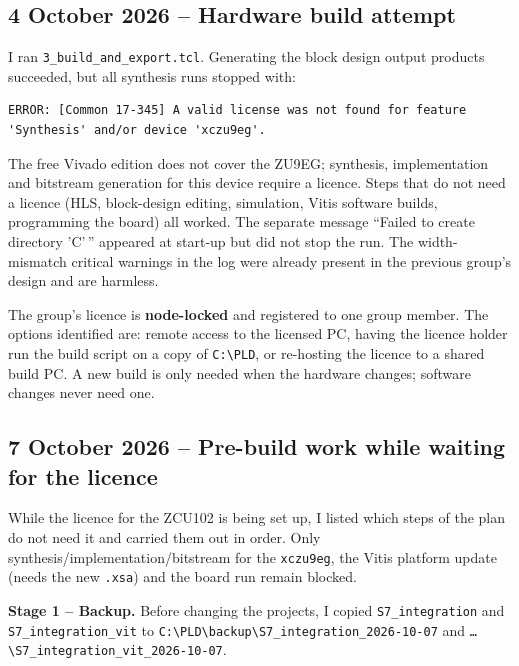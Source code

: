 \documentclass[11pt,a4paper]{article}
\newcommand{\code}[1]{\texttt{#1}}
\begin{document}
\subsection{4 October 2026 -- Hardware build attempt}
I ran \code{3\_build\_and\_export.tcl}. Generating the block design output products succeeded, but all synthesis runs stopped with:
\begin{lstlisting}
ERROR: [Common 17-345] A valid license was not found for feature
'Synthesis' and/or device 'xczu9eg'.
\end{lstlisting}
The free Vivado edition does not cover the ZU9EG; synthesis, implementation and bitstream generation for this device require a licence. Steps that do not need a licence (HLS, block-design editing, simulation, Vitis software builds, programming the board) all worked. The separate message ``Failed to create directory 'C'\,'' appeared at start-up but did not stop the run. The width-mismatch critical warnings in the log were already present in the previous group's design and are harmless.

The group's licence is \textbf{node-locked} and registered to one group member. The options identified are: remote access to the licensed PC, having the licence holder run the build script on a copy of \code{C:\textbackslash PLD}, or re-hosting the licence to a shared build PC. A new build is only needed when the hardware changes; software changes never need one.

\subsection{7 October 2026 -- Pre-build work while waiting for the licence}
While the licence for the ZCU102 is being set up, I listed which steps of the plan do not need it and carried them out in order. Only synthesis/implementation/bitstream for the \code{xczu9eg}, the Vitis platform update (needs the new \code{.xsa}) and the board run remain blocked.

{\sloppy \textbf{Stage 1 -- Backup.} Before changing the projects, I copied \code{S7\_integration} and \code{S7\_integration\_vit} to \code{C:\textbackslash PLD\textbackslash backup\textbackslash}\allowbreak\code{S7\_integration\_2026-10-07} and \code{\ldots\textbackslash}\allowbreak\code{S7\_integration\_vit\_2026-10-07}.\par}
\end{document}
